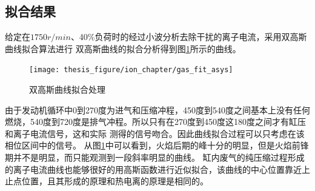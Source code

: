 \subsection{拟合结果}
给定在$1750r/min$、40\%负荷时的经过小波分析去除干扰的离子电流，采用双高斯曲线拟合算法进行
双高斯曲线的拟合分析得到图\ref{fig:gas_fit_asys}所示的曲线。
\begin{figure}[htb]
	\centering
	\texttt{[image: thesis\_figure/ion\_chapter/gas\_fit\_asys]}
	\caption{\label{fig:gas_fit_asys}双高斯曲线拟合处理}
\end{figure}
由于发动机循环中0到270度为进气和压缩冲程，450度到540度之间基本上没有任何燃烧，540度到720度是排气冲程。所以只有在270度到450度这180度之间才有缸压和离子电流信号，这和实际
测得的信号吻合。因此曲线拟合过程可以只考虑在该相位区间中的信号。
从图\ref{fig:gas_fit_asys}中可以看到，火焰后期的峰十分的明显，但是火焰前锋期并不是明显，而只能观测到一段斜率明显的曲线。
缸内废气的纯压缩过程形成的离子电流曲线也能够很好的用高斯函数进行近似拟合，该曲线的中心位置靠近上止点位置，且其形成的原理和热电离的原理是相同的。
